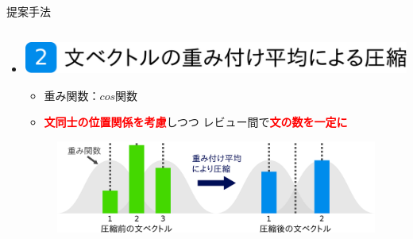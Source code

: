 \documentclass[unicode,10pt]{beamer}
\newlength{\mycolumnwidth}
\newlength{\mytitlefigureheight}
\newcommand{\itemtitle}[1]{\textbf{#1}\\}
\newcommand{\fire}[1]{\textcolor{red}{\textbf{#1}}}
\newcommand{\doublecolumns}[4]{
    \begin{minipage}[t]{#1}
      #2
    \end{minipage}
    \begin{minipage}[t]{#3}
      #4
    \end{minipage}}
\begin{document}
\begin{frame}[t]
\begin{block}{提案手法}
\begin{columns}[onlytextwidth,t]
    \begin{column}{\mycolumnwidth}
      \begin{itemize}
        \item \itemtitle{\includegraphics[height=\mytitlefigureheight]
                                         {fig/poster_model_title_2.pdf}}
          \begin{itemize}
            \item 重み関数：$cos$関数
            \item \fire{文同士の位置関係を考慮}しつつ
                  レビュー間で\fire{文の数を一定に}
          \end{itemize}
          \begin{figure}
            \includegraphics[width=\linewidth]
                            {fig/what_are_you_weighting_for.pdf}
          \end{figure}

\end{itemize}
\end{column}
\end{columns}
\end{block}
\end{frame}
\end{document}
